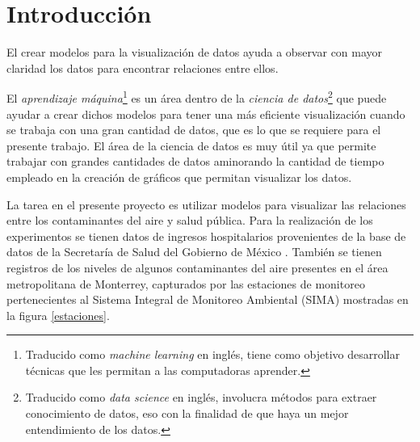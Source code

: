 \chapter{Introducción}

El crear modelos para la visualización de datos ayuda a observar con mayor claridad los datos para encontrar relaciones entre ellos.

El \emph{aprendizaje máquina}\footnote{Traducido como \emph{machine learning} en inglés, tiene como objetivo desarrollar técnicas que les permitan a las computadoras aprender.} es un área dentro de la \emph{ciencia de datos}\footnote{Traducido como \emph{data science} en inglés, involucra métodos para extraer conocimiento de datos, eso con la finalidad de que haya un mejor entendimiento de los datos.} que puede ayudar a crear dichos modelos para tener una más eficiente visualización cuando se trabaja con una gran cantidad de datos, que es lo que se requiere para el presente trabajo. El área de la ciencia de datos es muy útil ya que permite trabajar con grandes cantidades de datos aminorando la cantidad de tiempo empleado en la creación de gráficos que permitan visualizar los datos.

La tarea en el presente proyecto es utilizar modelos para visualizar las relaciones entre los contaminantes del aire y salud pública. Para la realización de los experimentos se tienen datos de ingresos hospitalarios provenientes de la base de datos de la Secretaría de Salud del Gobierno de México \cite{f1}. También se tienen registros de los niveles de algunos contaminantes del aire presentes en el área metropolitana de Monterrey, capturados por las estaciones de monitoreo pertenecientes al Sistema Integral de Monitoreo Ambiental (SIMA) \cite{f2} mostradas en la figura \ref{estaciones}.

